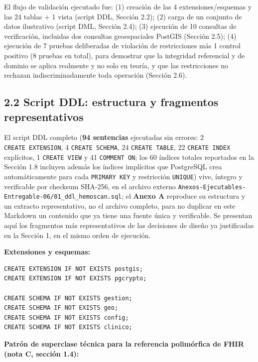 \documentclass[11pt,a4paper]{article}
\begin{document}
El flujo de validación ejecutado fue: (1) creación de las 4 extensiones/esquemas y las 24 tablas + 1 vista (script DDL, Sección 2.2); (2) carga de un conjunto de datos ilustrativo (script DML, Sección 2.4); (3) ejecución de 10 consultas de verificación, incluidas dos consultas geoespaciales PostGIS (Sección 2.5); (4) ejecución de 7 pruebas deliberadas de violación de restricciones más 1 control positivo (8 pruebas en total), para demostrar que la integridad referencial y de dominio se aplica realmente y no solo en teoría, y que las restricciones no rechazan indiscriminadamente toda operación (Sección 2.6).

\subsection{2.2 Script DDL: estructura y fragmentos representativos}\label{script-ddl-estructura-y-fragmentos-representativos}

El script DDL completo (\textbf{94 sentencias} ejecutadas sin errores: 2 \texttt{CREATE\ EXTENSION}, 4 \texttt{CREATE\ SCHEMA}, 24 \texttt{CREATE\ TABLE}, 22 \texttt{CREATE\ INDEX} explícitos, 1 \texttt{CREATE\ VIEW} y 41 \texttt{COMMENT\ ON}; los 60 índices totales reportados en la Sección 1.8 incluyen además los índices implícitos que PostgreSQL crea automáticamente para cada \texttt{PRIMARY\ KEY} y restricción \texttt{UNIQUE}) vive, íntegro y verificable por checksum SHA-256, en el archivo externo \texttt{Anexos-Ejecutables-Entregable-06/01\_ddl\_hemoscan.sql}; el \textbf{Anexo A} reproduce su estructura y un extracto representativo, no el archivo completo, para no duplicar en este Markdown un contenido que ya tiene una fuente única y verificable. Se presentan aquí los fragmentos más representativos de las decisiones de diseño ya justificadas en la Sección 1, en el mismo orden de ejecución.

\textbf{Extensiones y esquemas:}

\begin{samepage}\begin{verbatim}
CREATE EXTENSION IF NOT EXISTS postgis;
CREATE EXTENSION IF NOT EXISTS pgcrypto;

CREATE SCHEMA IF NOT EXISTS gestion;
CREATE SCHEMA IF NOT EXISTS geo;
CREATE SCHEMA IF NOT EXISTS config;
CREATE SCHEMA IF NOT EXISTS clinico;
\end{verbatim}\end{samepage}

\textbf{Patrón de superclase técnica para la referencia polimórfica de FHIR (nota C, sección 1.4):}
\end{document}
